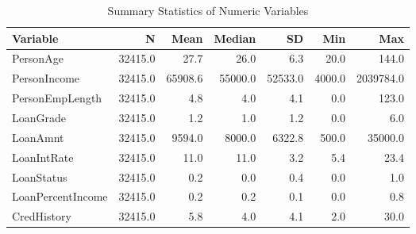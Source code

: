 \begin{table}[H]\centering
\caption{Summary Statistics of Numeric Variables}
\label{Table 2:summary_stats}
\begin{tabular}{lrrrrrr}
\toprule
Variable & N & Mean & Median & SD & Min & Max \\
\midrule
PersonAge & 32415.0 & 27.7 & 26.0 & 6.3 & 20.0 & 144.0 \\
PersonIncome & 32415.0 & 65908.6 & 55000.0 & 52533.0 & 4000.0 & 2039784.0 \\
PersonEmpLength & 32415.0 & 4.8 & 4.0 & 4.1 & 0.0 & 123.0 \\
LoanGrade & 32415.0 & 1.2 & 1.0 & 1.2 & 0.0 & 6.0 \\
LoanAmnt & 32415.0 & 9594.0 & 8000.0 & 6322.8 & 500.0 & 35000.0 \\
LoanIntRate & 32415.0 & 11.0 & 11.0 & 3.2 & 5.4 & 23.4 \\
LoanStatus & 32415.0 & 0.2 & 0.0 & 0.4 & 0.0 & 1.0 \\
LoanPercentIncome & 32415.0 & 0.2 & 0.2 & 0.1 & 0.0 & 0.8 \\
CredHistory & 32415.0 & 5.8 & 4.0 & 4.1 & 2.0 & 30.0 \\
\bottomrule
\end{tabular}
\end{table}
